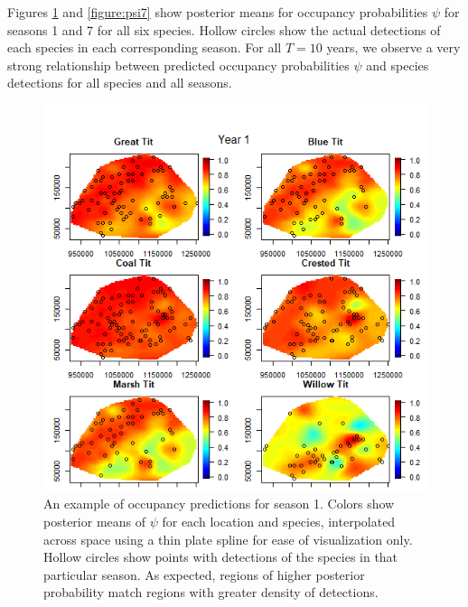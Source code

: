 Figures \ref{figure:psi1} and \ref{figure:psi7} show posterior means for occupancy probabilities $\psi$ for seasons 1 and 7 for all six species. Hollow circles show the actual detections of each species in each corresponding season.  For all $T=10$ years, we observe a very strong relationship between predicted occupancy probabilities $\psi$ and species detections for all species and all seasons. 

\begin{figure}[ht]
  \centering
  \includegraphics[width=5.5in]{psi1.png}
  \caption{An example of occupancy predictions for season 1.  Colors show posterior means of $\psi$ for each location and species, interpolated across space using a thin plate spline for ease of visualization only.  Hollow circles show points with detections of the species in that particular season.  As expected, regions of higher posterior probability match regions with greater density of detections.}
  \label{figure:psi1}
\end{figure}

